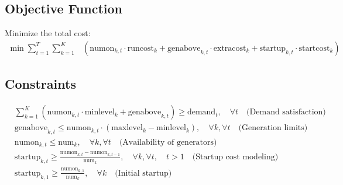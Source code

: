 \documentclass{article}
\begin{document}
\subsection*{Objective Function}
Minimize the total cost:
\begin{align*}
    \min \sum_{t=1}^{T} \sum_{k=1}^{K} & \left( \text{numon}_{k,t} \cdot \text{runcost}_{k} + \text{genabove}_{k,t} \cdot \text{extracost}_{k} + \text{startup}_{k,t} \cdot \text{startcost}_{k} \right)
\end{align*}

\subsection*{Constraints}
\begin{align*}
    & \sum_{k=1}^{K} \left( \text{numon}_{k,t} \cdot \text{minlevel}_{k} + \text{genabove}_{k,t} \right) \geq \text{demand}_{t}, \quad \forall t \quad \text{(Demand satisfaction)} \\
    & \text{genabove}_{k,t} \leq \text{numon}_{k,t} \cdot (\text{maxlevel}_{k} - \text{minlevel}_{k}), \quad \forall k, \forall t \quad \text{(Generation limits)} \\
    & \text{numon}_{k,t} \leq \text{num}_{k}, \quad \forall k, \forall t \quad \text{(Availability of generators)} \\
    & \text{startup}_{k,t} \geq \frac{\text{numon}_{k,t} - \text{numon}_{k,t-1}}{\text{num}_{k}}, \quad \forall k, \forall t, \quad t > 1 \quad \text{(Startup cost modeling)} \\
    & \text{startup}_{k,1} \geq \frac{\text{numon}_{k,1}}{\text{num}_{k}}, \quad \forall k \quad \text{(Initial startup)}
\end{align*}
\end{document}
